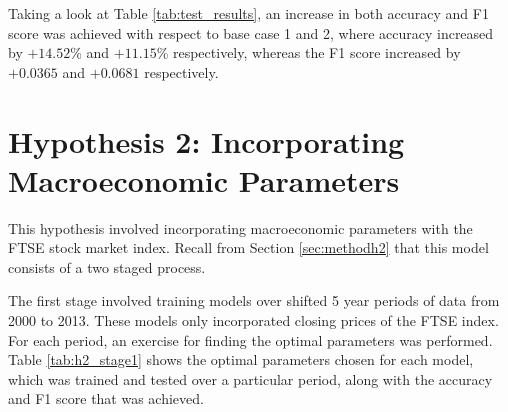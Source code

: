 \documentclass{UoYCSproject}
\begin{document}
Taking a look at Table \ref{tab:test_results}, an increase in both accuracy and F1 score was achieved with respect to base case 1 and 2, where accuracy increased by $+14.52$\% and $+11.15$\% respectively, whereas the F1 score increased by $+0.0365$ and $+0.0681$ respectively.

\section{Hypothesis 2: Incorporating Macroeconomic Parameters}
This hypothesis involved incorporating macroeconomic parameters with the FTSE stock market index. Recall from Section \ref{sec:methodh2} that this model consists of a two staged process.

The first stage involved training models over shifted 5 year periods of data from 2000 to 2013. These models only incorporated closing prices of the FTSE index. For each period, an exercise for finding the optimal parameters was performed. Table \ref{tab:h2_stage1} shows the optimal parameters chosen for each model, which was trained and tested over a particular period, along with the accuracy and F1 score that was achieved. 
\end{document}
